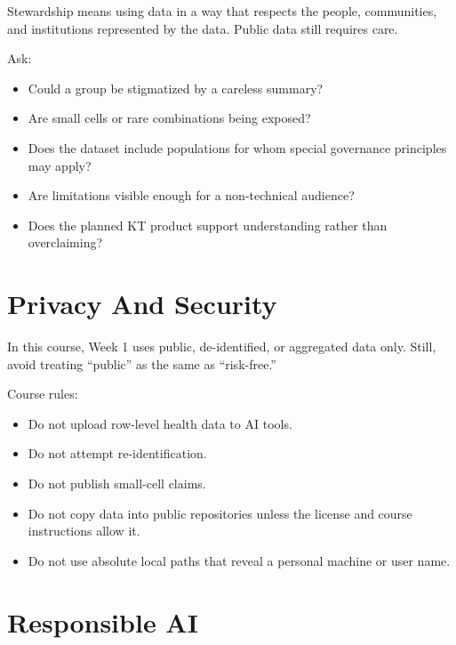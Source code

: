 \documentclass[
  letterpaper,
  DIV=11,
  numbers=noendperiod,
  oneside]{scrreprt}
\providecommand{\tightlist}{%
  \setlength{\itemsep}{0pt}\setlength{\parskip}{0pt}}
\begin{document}

Stewardship means using data in a way that respects the people,
communities, and institutions represented by the data. Public data still
requires care.

Ask:

\begin{itemize}
\tightlist
\item
  Could a group be stigmatized by a careless summary?
\item
  Are small cells or rare combinations being exposed?
\item
  Does the dataset include populations for whom special governance
  principles may apply?
\item
  Are limitations visible enough for a non-technical audience?
\item
  Does the planned KT product support understanding rather than
  overclaiming?
\end{itemize}

\section*{Privacy And Security}\label{privacy-and-security}


In this course, Week 1 uses public, de-identified, or aggregated data
only. Still, avoid treating ``public'' as the same as ``risk-free.''

Course rules:

\begin{itemize}
\tightlist
\item
  Do not upload row-level health data to AI tools.
\item
  Do not attempt re-identification.
\item
  Do not publish small-cell claims.
\item
  Do not copy data into public repositories unless the license and
  course instructions allow it.
\item
  Do not use absolute local paths that reveal a personal machine or user
  name.
\end{itemize}

\section*{Responsible AI}\label{responsible-ai}
\end{document}
